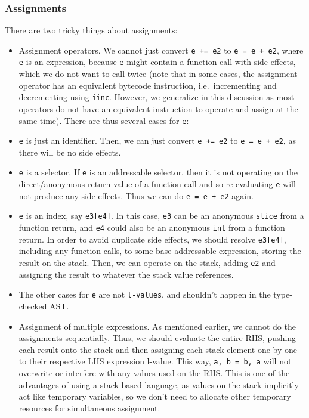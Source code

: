 \documentclass[11pt]{article}
\begin{document}
\subsubsection{Assignments}
There are two tricky things about assignments:
\begin{itemize}[noitemsep]
	\item Assignment operators. We cannot just convert \texttt{e += e2} to \texttt{e =
		      e + e2}, where \texttt{e} is an expression, because \texttt{e} might contain a
	      function call with side-effects, which we do not want to call
	      twice (note that in some cases, the assignment operator has an
	      equivalent bytecode instruction, i.e.\ incrementing and
	      decrementing using \texttt{iinc}. However, we generalize in this
	      discussion as most operators do not have an equivalent
	      instruction to operate and assign at the same time). There are
	      thus several cases for \texttt{e}:
\end{itemize}
\begin{itemize}[noitemsep]
	\item \texttt{e} is just an identifier. Then, we can just convert \texttt{e += e2}
	      to \texttt{e = e + e2}, as there will be no side effects.
	\item \texttt{e} is a selector. If \texttt{e} is an addressable selector, then it
	      is not operating on the direct/anonymous return value of a
	      function call and so re-evaluating \texttt{e} will not produce any
	      side effects. Thus we can do \texttt{e = e + e2} again.
	\item \texttt{e} is an index, say \texttt{e3[e4]}. In this case, \texttt{e3} can be an
	      anonymous \texttt{slice} from a function return, and \texttt{e4} could also
	      be an anonymous \texttt{int} from a function return. In order to
	      avoid duplicate side effects, we should resolve \texttt{e3[e4]},
	      including any function calls, to some base addressable
	      expression, storing the result on the stack. Then, we can
	      operate on the stack, adding \texttt{e2} and assigning the result to
	      whatever the stack value references.
	\item The other cases for \texttt{e} are not \texttt{l-values}, and shouldn't happen
	      in the type-checked AST.\@
\end{itemize}
\begin{itemize}
	\item Assignment of multiple expressions. As mentioned earlier, we
	      cannot do the assignments sequentially. Thus, we should evaluate
	      the entire RHS, pushing each result onto the stack and then
	      assigning each stack element one by one to their respective LHS
	      expression l-value. This way, \texttt{a, b = b, a} will not overwrite
	      or interfere with any values used on the RHS. This is one of the
	      advantages of using a stack-based language, as values on the
	      stack implicitly act like temporary variables, so we don't need
	      to allocate other temporary resources for simultaneous
	      assignment.
\end{itemize}
\end{document}
